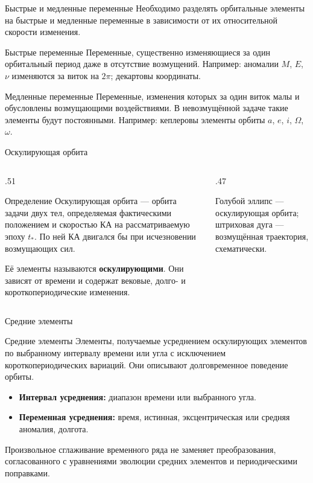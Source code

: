 \documentclass[11pt,aspectratio=169,t]{beamer}
\begin{document}
\begin{frame}{Быстрые и медленные переменные}
\justifying
Необходимо разделять орбитальные элементы на быстрые и медленные переменные в зависимости от их относительной скорости изменения.
\begin{block}{Быстрые переменные}
\justifying
Переменные, существенно изменяющиеся за один орбитальный период даже в отсутствие возмущений. Например: аномалии $M$, $E$, $\nu$ изменяются за виток на $2\pi$; декартовы координаты.
\end{block}
\begin{block}{Медленные переменные}
\justifying
Переменные, изменения которых за один виток малы и обусловлены возмущающими воздействиями. В невозмущённой задаче такие элементы будут постоянными. Например: кеплеровы элементы орбиты $a$, $e$, $i$, $\Omega$, $\omega$.
\end{block}
\end{frame}

\begin{frame}{Оскулирующая орбита}
\begin{columns}[T,onlytextwidth]
\begin{column}{.51\textwidth}
\begin{block}{Определение}
\justifying
Оскулирующая орбита --- орбита задачи двух тел, определяемая фактическими положением и скоростью КА на рассматриваемую эпоху $t_*$. По ней КА двигался бы при исчезновении возмущающих сил.
\end{block}
\justifying
Её элементы называются \textbf{оскулирующими}. Они зависят от времени и содержат вековые, долго- и короткопериодические изменения.

\end{column}
\begin{column}{.47\textwidth}\centering
\par
{Голубой эллипс --- оскулирующая орбита; штриховая дуга --- возмущённая траектория, схематически.\par}
\end{column}
\end{columns}
\end{frame}

\begin{frame}{Средние элементы}
\begin{block}{Средние элементы}
\justifying
Элементы, получаемые усреднением оскулирующих элементов по выбранному интервалу времени или угла с исключением короткопериодических вариаций. Они описывают долговременное поведение орбиты.
\end{block}
\begin{itemize}
\item \textbf{Интервал усреднения:} диапазон времени или выбранного угла.
\item \textbf{Переменная усреднения:} время, истинная, эксцентрическая или средняя аномалия, долгота.
\end{itemize}
\justifying
Произвольное сглаживание временного ряда не заменяет преобразования, согласованного с уравнениями эволюции средних элементов и периодическими поправками.
\end{frame}
\end{document}
